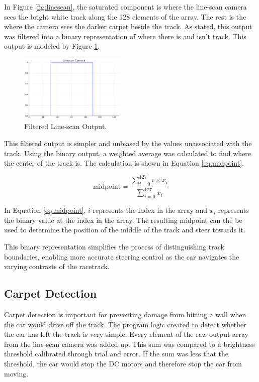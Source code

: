 \documentclass[conference]{IEEEtran}
\begin{document}
In Figure \ref{fig:linescan}, the saturated component is where the line-scan camera sees the bright white track along the 128 elements of the array. The rest is the where the camera sees the darker carpet beside the track. As stated, this output was filtered into a binary representation of where there is and isn't track. This output is modeled by Figure \ref{fig:linescanFiltered}.

\begin{figure}[htbp]
	\centerline{\includegraphics[width=0.45\textwidth]{images/linescanFiltered.png}}
	\caption{Filtered Line-scan Output.}
	\label{fig:linescanFiltered}
\end{figure}

This filtered output is simpler and unbiased by the values unassociated with the track. Using the binary output, a weighted average was calculated to find where the center of the track is. The calculation is shown in Equation \ref{eq:midpoint}.

\begin{equation}
	\text{midpoint} = \frac{\sum_{i=0}^{127} i \times x_i}{\sum_{i=0}^{127} x_i}\label{eq:midpoint}
\end{equation}

In Equation \ref{eq:midpoint}, $i$ represents the index in the array and $x_i$ represents the binary value at the index in the array. The resulting midpoint can the be used to determine the position of the middle of the track and steer towards it.

This binary representation simplifies the process of distinguishing track boundaries, enabling more accurate steering control as the car navigates the varying contrasts of the racetrack.

\subsection{Carpet Detection}

Carpet detection is important for preventing damage from hitting a wall when the car would drive off the track. The program logic created to detect whether the car has left the track is very simple. Every element of the raw output array from the line-scan camera was added up. This sum was compared to a brightness threshold calibrated through trial and error. If the sum was less that the threshold, the car would stop the DC motors and therefore stop the car from moving.
\end{document}
